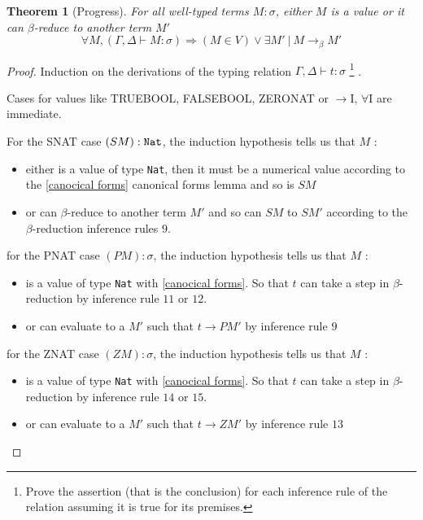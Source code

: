 \documentclass{article}
\newtheorem{theorem}{Theorem}[section]
\begin{document}
    \begin{theorem}[Progress]
    \label{Progress}
    For all well-typed terms $M:\sigma$, either $M$ is a value or it can $\beta$-reduce to another term $M'$
    $$\forall M, (\Gamma,\Delta\vdash M:\sigma)\Rightarrow (M \in V) \vee \exists M' \ | \  M\rightarrow_\beta M'$$
    \end{theorem}
    \begin{proof}
        Induction on the derivations of the typing relation $\Gamma,\Delta\vdash t:\sigma$
        \footnote{Prove the assertion (that is the conclusion) for each inference rule of the relation assuming it is true for its premises. }
        .\par
        Cases for values like TRUEBOOL, FALSEBOOL, ZERONAT or $\rightarrow$I, $\forall$I are immediate.\par
        For the SNAT case $(S M) : \verb|Nat|$, the induction hypothesis tells us that $M$ :
        \begin{itemize}
            \item either is a value of type \texttt{Nat}, then it must be a numerical value according to the 
            \ref{canocical forms} canonical forms lemma and so is $S M$
            \item or can $\beta$-reduce to another term $M'$ and so can $S M$ to $S M'$ according to the $\beta$-reduction inference rules $9$.
        \end{itemize}
        \par for the PNAT case $(P M) : \sigma$, the induction hypothesis tells us that $M$ :
        \begin{itemize}
            \item is a value of type \texttt{Nat} with \ref{canocical forms}. So that $t$ can take a step in $\beta$-reduction by inference rule $11$ or $12$.
            \item or can evaluate to a $M'$ such that $t\rightarrow P M'$ by inference rule $9$
        \end{itemize}
        \par for the ZNAT case $(Z M) : \sigma$, the induction hypothesis tells us that $M$ : 
        \begin{itemize}
            \item is a value of type \texttt{Nat} with \ref{canocical forms}. So that $t$ can take a step in $\beta$-reduction by inference rule $14$ or $15$.
            \item or can evaluate to a $M'$ such that $t\rightarrow Z M'$ by inference rule $13$

\end{itemize}
\end{proof}
\end{document}
